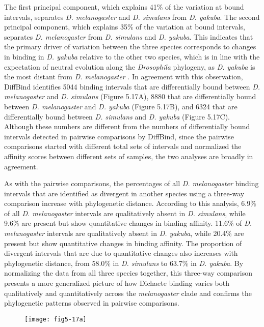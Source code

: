 The first principal component, which explains 41\% of the variation at bound intervals, separates \emph{D. melanogaster} and \emph{D. simulans} from \emph{D. yakuba}. The second principal component, which explains 35\% of the variation at bound intervals, separates \emph{D. melanogaster} from \emph{D. simulans} and \emph{D. yakuba}. This indicates that the primary driver of variation between the three species corresponds to changes in binding in \emph{D. yakuba} relative to the other two species, which is in line with the expectation of neutral evolution along the \emph{Drosophila} phylogeny, as \emph{D. yakuba} is the most distant from \emph{D. melanogaster} \citep{russo_molecular_1995}. In agreement with this observation, DiffBind identifies 5044 binding intervals that are differentially bound between \emph{D. melanogaster} and \emph{D. simulans} (Figure 5.17A), 8880 that are differentially bound between \emph{D. melanogaster} and \emph{D. yakuba} (Figure 5.17B), and 6324 that are differentially bound between \emph{D. simulans} and \emph{D. yakuba} (Figure 5.17C). Although these numbers are different from the numbers of differentially bound intervals detected in pairwise comparisons by DiffBind, since the pairwise comparisons started with different total sets of intervals and normalized the affinity scores between different sets of samples, the two analyses are broadly in agreement.

As with the pairwise comparisons, the percentages of all \emph{D. melanogaster} binding intervals that are identified as divergent in another species using a three-way comparison increase with phylogenetic distance. According to this analysis, 6.9\% of all \emph{D. melanogaster} intervals are qualitatively absent in \emph{D. simulans}, while 9.6\% are present but show quantitative changes in binding affinity. 11.6\% of \emph{D. melanogaster} intervals are qualitatively absent in \emph{D. yakuba}, while 20.4\% are present but show quantitative changes in binding affinity. The proportion of divergent intervals that are due to quantitative changes also increases with phylogenetic distance, from 58.0\% in \emph{D. simulans} to 63.7\% in \emph{D. yakuba}. By normalizing the data from all three species together, this three-way comparison presents a more generalized picture of how Dichaete binding varies both qualitatively and quantitatively across the \emph{melanogaster} clade and confirms the phylogenetic patterns observed in pairwise comparisons.


\begin{figure}[H]
\centering
\texttt{[image: fig5-17a]}
\label{Figure 5.17}
\end{figure}

